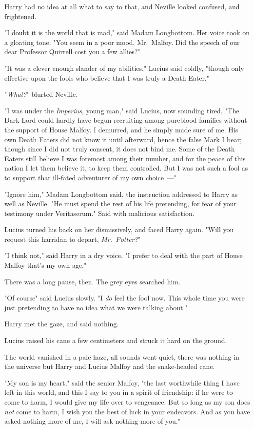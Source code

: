 Harry had no idea at all what to say to that, and Neville looked confused, and
frightened.

"I doubt it is the world that is mad," said Madam Longbottom. Her voice took on
a gloating tone. "You seem in a poor mood, Mr.~Malfoy. Did the speech of our
dear Professor Quirrell cost you a few allies?"

"It was a clever enough slander of my abilities," Lucius said coldly, "though
only effective upon the fools who believe that I was truly a Death Eater."

"\emph{What?}" blurted Neville.

"I was under the \emph{Imperius,} young man," said Lucius, now sounding tired.
"The Dark Lord could hardly have begun recruiting among pureblood families
without the support of House Malfoy. I demurred, and he simply made sure of me.
His own Death Eaters did not know it until afterward, hence the false Mark I
bear; though since I did not truly consent, it does not bind me. Some of the
Death Eaters still believe I was foremost among their number, and for the peace
of this nation I let them believe it, to keep them controlled. But I was not
such a fool as to support that ill-fated adventurer of my own choice~---"

"Ignore him," Madam Longbottom said, the instruction addressed to Harry as well
as Neville. "He must spend the rest of his life pretending, for fear of your
testimony under Veritaserum." Said with malicious satisfaction.

Lucius turned his back on her dismissively, and faced Harry again. "Will you
request this harridan to depart, \emph{Mr.~Potter?}"

"I think not," said Harry in a dry voice. "I prefer to deal with the part of
House Malfoy that's my own age."

There was a long pause, then. The grey eyes searched him.

"Of course{\el}" said Lucius slowly. "I \emph{do} feel the fool now. This
whole time you were just pretending to have no idea what we were talking about."

Harry met the gaze, and said nothing.

Lucius raised his cane a few centimeters and struck it hard on the ground.

The world vanished in a pale haze, all sounds went quiet, there was nothing in
the universe but Harry and Lucius Malfoy and the snake-headed cane.

"My son is my heart," said the senior Malfoy, "the last worthwhile thing I have
left in this world, and this I say to you in a spirit of friendship: if he were
to come to harm, I would give my life over to vengeance. But so long as my son
does \emph{not} come to harm, I wish you the best of luck in your endeavors.
And as you have asked nothing more of me, I will ask nothing more of you."

